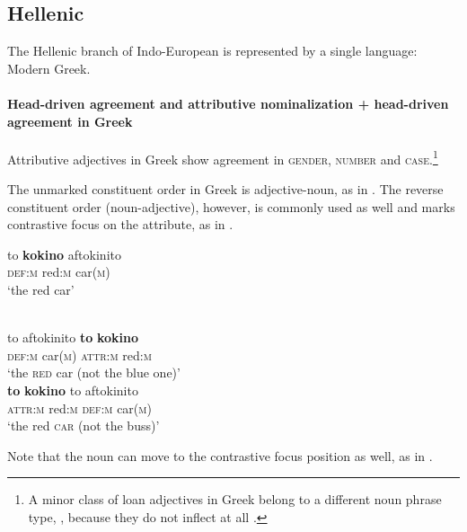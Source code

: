 \subsection{Hellenic}
\label{greek synchr}
The Hellenic branch of Indo-European is represented by a single language: Modern Greek. 

\paragraph*{Head\hyp{}driven agreement and attributive nominalization + head\hyp{}driven agreement in Greek}
Attributive adjectives in Greek show agreement in \textsc{gender, number} and \textsc{case}.\footnote{A minor class of loan adjectives in Greek belong to a different noun phrase type, , because they do not inflect at all \citep{ruge1986}.}

The unmarked constituent order in Greek is adjective-noun, as in . The reverse constituent order (noun-adjective), however, is commonly used as well and marks contrastive focus on the attribute, as in .
\begin{exe}
\begin{xlist}
\label{greek agr}
\begin{xlist}
\ex
\gll	to			\textbf{kokino} 	aftokinito\\
	\textsc{def:m}	red:\textsc{m}	car(\textsc{m})\\
\glt	‘the red car’
\end{xlist}
\label{greek attr}
\begin{xlist}
\\
\label{greek afocus}
\gll	to 			aftokinito		\textbf{to}				\textbf{kokino}\\
	\textsc{def:m}	car(\textsc{m})	\textsc{attr:m}	red:\textsc{m}\\
\glt	‘the \textsc{red} car (not the blue one)’
\\
\label{greek nfocus}
\gll	\textbf{to}				\textbf{kokino}		to		aftokinito\\
	\textsc{attr:m}	red:\textsc{m}	\textsc{def:m}	car(\textsc{m})\\
\glt	‘the red \textsc{car} (not the buss)’
\end{xlist}
\end{xlist}
\end{exe}
Note that the noun can move to the contrastive focus position as well, as in .

